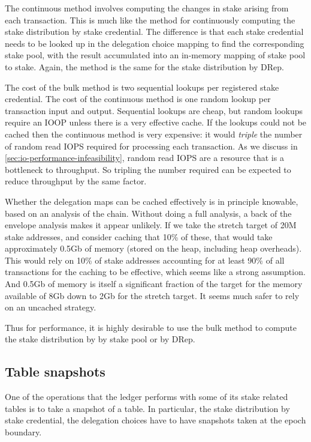 \documentclass[11pt,a4paper]{article}
\begin{document}
The continuous method involves computing the changes in stake arising from
each transaction. This is much like the method for continuously computing the
stake distribution by stake credential. The difference is that each stake
credential needs to be looked up in the delegation choice mapping to find the
corresponding stake pool, with the result accumulated into an in-memory mapping
of stake pool to stake. Again, the method is the same for the stake
distribution by DRep.

The cost of the bulk method is two sequential lookups per registered stake
credential. The cost of the continuous method is one random lookup per
transaction input and output. Sequential lookups are cheap, but random lookups
require an IOOP unless there is a very effective cache. If the lookups could
not be cached then the continuous method is very expensive: it would
\emph{triple} the number of random read IOPS required for processing each
transaction. As we discuss in \cref{sec:io-performance-infeasibility}, random
read IOPS are a resource that is a bottleneck to throughput. So tripling the
number required can be expected to reduce throughput by the same factor.

Whether the delegation maps can be cached effectively is in principle knowable,
based on an analysis of the chain. Without doing a full analysis, a back of the
envelope analysis makes it appear unlikely. If we take the stretch target of
20M stake addresses, and consider caching that 10\% of these, that would take
approximately 0.5Gb of memory (stored on the heap, including heap overheads).
This would rely on 10\% of stake addresses accounting for at least 90\% of all
transactions for the caching to be effective, which seems like a strong
assumption. And 0.5Gb of memory is itself a significant fraction of the target
for the memory available of 8Gb down to 2Gb for the stretch target. It seems
much safer to rely on an uncached strategy.

Thus for performance, it is highly desirable to use the bulk method to compute
the stake distribution by by stake pool or by DRep.

\subsection{Table snapshots}
\label{sec:table-snapshots}

One of the operations that the ledger performs with some of its stake related
tables is to take a snapshot of a table. In particular, the stake distribution
by stake credential, the delegation choices have to have snapshots taken at the
epoch boundary.
\end{document}
